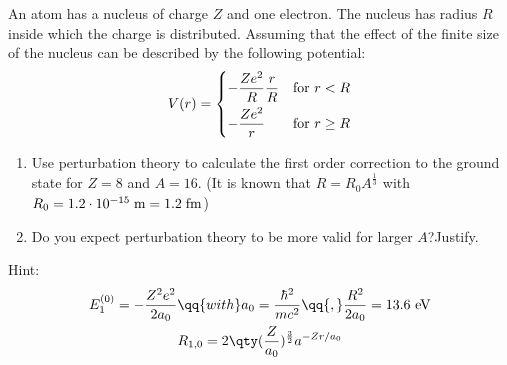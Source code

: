 \begin{esercizio}[(07/02/2018 n°1)]
   An atom has a nucleus of charge $Z$ and one electron. The nucleus has radius $R$ inside which the charge is distributed. Assuming that the effect of the finite size of the nucleus can be described by the following potential:
   \begin{equation*}
      V(r)=
      \begin{dcases}
         -\frac{Z e^2}{R} \frac{r}{R} & \text{for } r<R\\
         -\frac{Z e^2}{r} & \text{for } r \geq R
      \end{dcases}
   \end{equation*}
   \begin{enumerate}[label=\alph*), leftmargin=0.6cm]
      \item Use perturbation theory to calculate the first order correction to the ground state for $Z=8$ and $A=16$. (It is known that $R=R_0A^{\frac{1}{3}}$ with $R_0=1.2 \cdot 10^{-15} \; \rm m=1.2 \; fm$)
      \item Do you expect perturbation theory to be more valid for larger $A$?\footnotemark Justify.
   \end{enumerate}
   Hint:
   \begin{gather*}
      E_1^{(0)}=-\frac{Z^2 e^2}{2a_0}
      \qq{with}
      a_0=\frac{\hbar^2}{mc^2}
      \qq{,}
      \frac{R^2}{2a_0}=13.6 \text{ eV}
      \\
      R_{1,0}=2\qty( \frac{Z}{a_0} )^{\frac{3}{2}} a^{-Zr/a_0}
   \end{gather*}
\end{esercizio}
